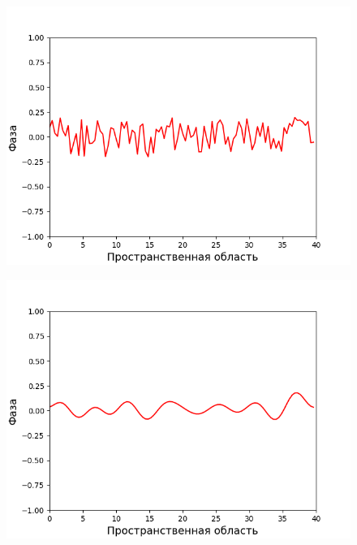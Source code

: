 \begin{figure}[p]
    \centering
    \begin{minipage}{0.49\linewidth}
        \includegraphics[width=\linewidth]{images/3-data_data_0.bin.png}
        \label{fig:modeling_1_d:1}
    \end{minipage}
    \hfill
    \begin{minipage}{0.49\linewidth}
        \includegraphics[width=\linewidth]{images/3-data_data_10000.bin.png}
        \label{fig:modeling_1_d:2}
    \end{minipage}


\end{figure}
